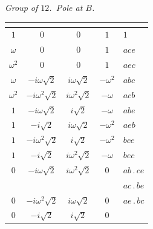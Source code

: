 \documentclass[11pt]{article}
\begin{document}
\medskip
\begin{center}
\textit{Group of $12$.\ Pole at $B$.}
\smallskip
\begin{tabular}{cccc|l}
\multicolumn{4}{c}{}\\
\hline
$1$           & $0$              & $0$              & $1$              & $1$\\
$\omega$      & $0$              & $0$              & $1$              & $ace$\\
$\omega^{2}$  & $0$              & $0$              & $1$              & $aec$\\
$\omega$      & $-i\omega\sqrt{2}$ & $i\omega\sqrt{2}$ & $-\omega^{2}$ & $abc$\\
$\omega^{2}$  & $-i\omega^{2}\sqrt{2}$ & $i\omega^{2}\sqrt{2}$ & $-\omega$ & $acb$\\
$1$           & $-i\omega\sqrt{2}$ & $i\sqrt{2}$ & $-\omega$ & $abe$\\
$1$           & $-i\sqrt{2}$ & $i\omega\sqrt{2}$ & $-\omega^{2}$ & $aeb$\\
$1$           & $-i\omega^{2}\sqrt{2}$ & $i\sqrt{2}$ & $-\omega^{2}$ & $bce$\\
$1$           & $-i\sqrt{2}$ & $i\omega^{2}\sqrt{2}$ & $-\omega$ & $bec$\\
$0$           & $-i\omega\sqrt{2}$ & $i\omega^{2}\sqrt{2}$ & $0$ & $ab\,.\,ce$\\
              &                  &                  &                  & $ac\,.\,be$\\
$0$           & $-i\omega^{2}\sqrt{2}$ & $i\omega\sqrt{2}$ & $0$ & $ae\,.\,bc$\\
$0$           & $-i\sqrt{2}$ & $i\sqrt{2}$ & $0$ & \\
\end{tabular}
\end{center}
\end{document}
